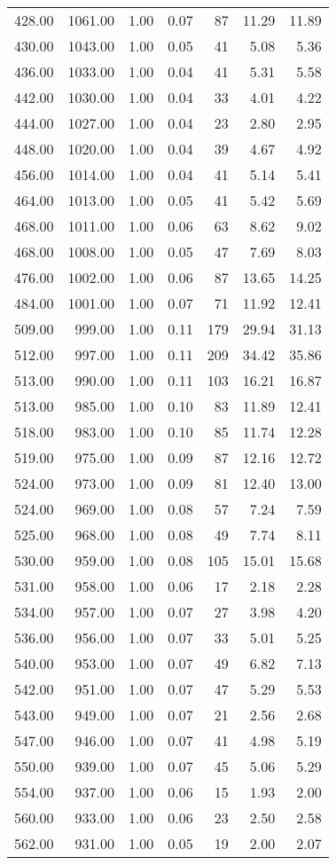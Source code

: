 \begin{table}
\begin{tabular}{rrrrrrr}
428.00 & 1061.00 & 1.00 & 0.07 & 87 & 11.29 & 11.89 \\
430.00 & 1043.00 & 1.00 & 0.05 & 41 & 5.08 & 5.36 \\
436.00 & 1033.00 & 1.00 & 0.04 & 41 & 5.31 & 5.58 \\
442.00 & 1030.00 & 1.00 & 0.04 & 33 & 4.01 & 4.22 \\
444.00 & 1027.00 & 1.00 & 0.04 & 23 & 2.80 & 2.95 \\
448.00 & 1020.00 & 1.00 & 0.04 & 39 & 4.67 & 4.92 \\
456.00 & 1014.00 & 1.00 & 0.04 & 41 & 5.14 & 5.41 \\
464.00 & 1013.00 & 1.00 & 0.05 & 41 & 5.42 & 5.69 \\
468.00 & 1011.00 & 1.00 & 0.06 & 63 & 8.62 & 9.02 \\
468.00 & 1008.00 & 1.00 & 0.05 & 47 & 7.69 & 8.03 \\
476.00 & 1002.00 & 1.00 & 0.06 & 87 & 13.65 & 14.25 \\
484.00 & 1001.00 & 1.00 & 0.07 & 71 & 11.92 & 12.41 \\
509.00 & 999.00 & 1.00 & 0.11 & 179 & 29.94 & 31.13 \\
512.00 & 997.00 & 1.00 & 0.11 & 209 & 34.42 & 35.86 \\
513.00 & 990.00 & 1.00 & 0.11 & 103 & 16.21 & 16.87 \\
513.00 & 985.00 & 1.00 & 0.10 & 83 & 11.89 & 12.41 \\
518.00 & 983.00 & 1.00 & 0.10 & 85 & 11.74 & 12.28 \\
519.00 & 975.00 & 1.00 & 0.09 & 87 & 12.16 & 12.72 \\
524.00 & 973.00 & 1.00 & 0.09 & 81 & 12.40 & 13.00 \\
524.00 & 969.00 & 1.00 & 0.08 & 57 & 7.24 & 7.59 \\
525.00 & 968.00 & 1.00 & 0.08 & 49 & 7.74 & 8.11 \\
530.00 & 959.00 & 1.00 & 0.08 & 105 & 15.01 & 15.68 \\
531.00 & 958.00 & 1.00 & 0.06 & 17 & 2.18 & 2.28 \\
534.00 & 957.00 & 1.00 & 0.07 & 27 & 3.98 & 4.20 \\
536.00 & 956.00 & 1.00 & 0.07 & 33 & 5.01 & 5.25 \\
540.00 & 953.00 & 1.00 & 0.07 & 49 & 6.82 & 7.13 \\
542.00 & 951.00 & 1.00 & 0.07 & 47 & 5.29 & 5.53 \\
543.00 & 949.00 & 1.00 & 0.07 & 21 & 2.56 & 2.68 \\
547.00 & 946.00 & 1.00 & 0.07 & 41 & 4.98 & 5.19 \\
550.00 & 939.00 & 1.00 & 0.07 & 45 & 5.06 & 5.29 \\
554.00 & 937.00 & 1.00 & 0.06 & 15 & 1.93 & 2.00 \\
560.00 & 933.00 & 1.00 & 0.06 & 23 & 2.50 & 2.58 \\
562.00 & 931.00 & 1.00 & 0.05 & 19 & 2.00 & 2.07 \\
\bottomrule
\end{tabular}
\end{table}
